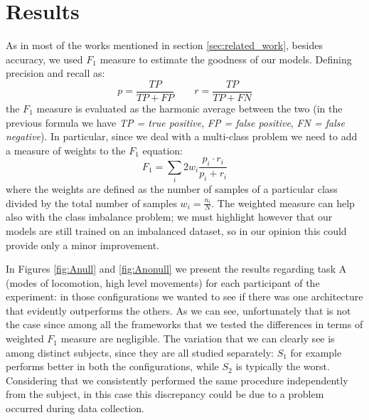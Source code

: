 
\section{Results}
\label{sec:results}

As in most of the works mentioned in section \ref{sec:related_work}, besides accuracy, we used $F_1$ measure to estimate the goodness of our models. Defining precision and recall as: 
\begin{equation}
	p = \frac{TP}{TP+FP} \qquad r = \frac{TP}{TP+FN}
\end{equation}
the $F_1$ measure is evaluated as the harmonic average between the two (in the previous formula we have \textit{TP = true positive}, \textit{FP = false positive}, \textit{FN = false negative}). In particular, since we deal with a multi-class problem we need to add a measure of weights to the $F_1$ equation:
\begin{equation}
	F_1 = \sum_i 2w_i \frac{p_i \cdot r_i}{p_i + r_i}
\end{equation} 
where the weights are defined as the number of samples of a particular class divided by the total number of samples $w_i = \frac{n_i}{N}$. The weighted measure can help also with the class imbalance problem; we must highlight however that our models are still trained on an imbalanced dataset, so in our opinion this could provide only a minor improvement.

In Figures \ref{fig:Anull} and \ref{fig:Anonull} we present the results regarding task A (modes of locomotion, high level movements) for each participant of the experiment: in those configurations we wanted to see if there was one architecture that evidently outperforms the others. As we can see, unfortunately that is not the case since among all the frameworks that we tested the differences in terms of weighted $F_1$ measure are negligible. The variation that we can clearly see is among distinct subjects, since they are all studied separately: $S_1$ for example performs better in both the configurations, while $S_2$ is typically the worst. Considering that we consistently performed the same procedure independently from the subject, in this case this discrepancy could be due to a problem occurred during data collection. 

